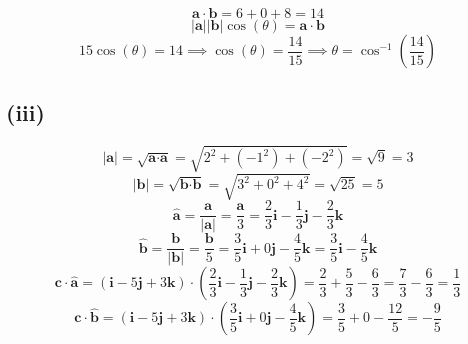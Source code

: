 \documentclass{article}
\begin{document}
\begin{equation*}
    \textbf{a} \cdot \textbf{b} = 6 + 0 + 8 = 14
\end{equation*}
\begin{equation*}
    |\textbf{a}||\textbf{b}| \cos(\theta) = \textbf{a} \cdot \textbf{b}
\end{equation*}
\begin{equation*}
    15 \cos(\theta) = 14 \implies \cos(\theta) = \frac{14}{15} \implies \theta = \cos^{-1}(\frac{14}{15})
\end{equation*}


\subsection*{(iii)}

\begin{equation*}
    |\textbf{a}| = \sqrt{\textbf{a} \cdot \textbf{a}} = \sqrt{2^2 + (-1^2) + (-2^2)} = \sqrt{9} = 3
\end{equation*}
\begin{equation*}
    |\textbf{b}| = \sqrt{\textbf{b} \cdot \textbf{b}} = \sqrt{3^2 + 0^2 + 4^2} = \sqrt{25} = 5
\end{equation*}
\begin{equation*}
    \hat{\textbf{a}} = \frac{\textbf{a}}{|\textbf{a}|} = \frac{\textbf{a}}{3} = \frac{2}{3}\textbf{i} - \frac{1}{3}\textbf{j} - \frac{2}{3}\textbf{k}
\end{equation*}
\begin{equation*}
    \hat{\textbf{b}} = \frac{\textbf{b}}{|\textbf{b}|} = \frac{\textbf{b}}{5} = \frac{3}{5}\textbf{i} + 0\textbf{j} - \frac{4}{5}\textbf{k} = \frac{3}{5}\textbf{i} - \frac{4}{5}\textbf{k}
\end{equation*}
\begin{equation*}
    \textbf{c} \cdot \hat{\textbf{a}} = (\textbf{i} - 5\textbf{j} + 3\textbf{k}) \cdot (\frac{2}{3}\textbf{i} - \frac{1}{3}\textbf{j} - \frac{2}{3}\textbf{k}) = \frac{2}{3} + \frac{5}{3} - \frac{6}{3} = \frac{7}{3} - \frac{6}{3} = \frac{1}{3}
\end{equation*}
\begin{equation*}
    \textbf{c} \cdot \hat{\textbf{b}} = (\textbf{i} - 5\textbf{j} + 3\textbf{k}) \cdot (\frac{3}{5}\textbf{i} + 0\textbf{j} - \frac{4}{5}\textbf{k}) = \frac{3}{5} + 0 - \frac{12}{5} = - \frac{9}{5}
\end{equation*}
\end{document}
